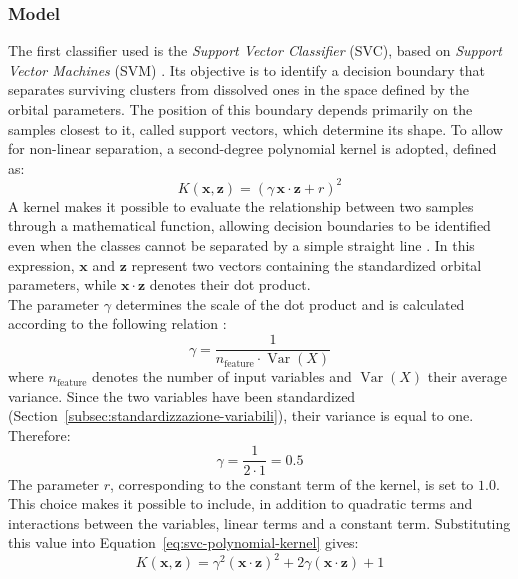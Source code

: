 \subsubsection{Model}
The first classifier used is the \emph{Support Vector Classifier} (SVC), based on \emph{Support Vector Machines} (SVM) \cite{cortes1995support}. Its objective is to identify a decision boundary that separates surviving clusters from dissolved ones in the space defined by the orbital parameters. The position of this boundary depends primarily on the samples closest to it, called support vectors, which determine its shape.
To allow for non-linear separation, a second-degree polynomial kernel is adopted, defined as:
\begin{equation}
	K(\mathbf{x},\mathbf{z})=(\gamma\,\mathbf{x}\cdot\mathbf{z}+r)^2
	\label{eq:svc-polynomial-kernel}
\end{equation}
A kernel makes it possible to evaluate the relationship between two samples through a mathematical function, allowing decision boundaries to be identified even when the classes cannot be separated by a simple straight line \cite{scholkopf2002learning}. In this expression, $\mathbf{x}$ and $\mathbf{z}$ represent two vectors containing the standardized orbital parameters, while $\mathbf{x}\cdot\mathbf{z}$ denotes their dot product.\\
The parameter $\gamma$ determines the scale of the dot product and is calculated according to the following relation \cite{scikitlearnsvmdoc}:
\begin{equation}
	\gamma = \frac{1}{n_{\mathrm{feature}}\cdot\operatorname{Var}(X)}
	\label{eq:svc-gamma}
\end{equation}
where $n_{\mathrm{feature}}$ denotes the number of input variables and $\operatorname{Var}(X)$ their average variance. Since the two variables have been standardized (Section~\ref{subsec:standardizzazione-variabili}), their variance is equal to one. Therefore:
\[
\gamma = \frac{1}{2\cdot 1}=0.5
\]
The parameter $r$, corresponding to the constant term of the kernel, is set to $1.0$. This choice makes it possible to include, in addition to quadratic terms and interactions between the variables, linear terms and a constant term. Substituting this value into Equation~\ref{eq:svc-polynomial-kernel} gives:
\begin{equation}
	K(\mathbf{x},\mathbf{z}) =
	\gamma^2(\mathbf{x}\cdot\mathbf{z})^2
	+2\gamma(\mathbf{x}\cdot\mathbf{z})+1
	\label{eq:svc-polynomial-kernel-expanded}
\end{equation}
